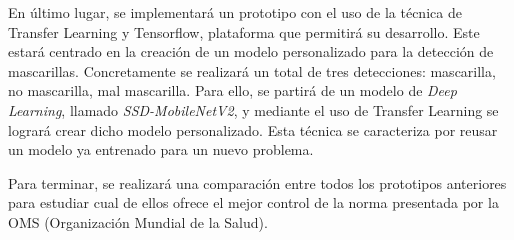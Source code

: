 En último lugar, se implementará un prototipo con el uso de la técnica de Transfer Learning y Tensorflow, plataforma que permitirá su desarrollo. Este estará centrado en la creación de un modelo personalizado para la detección de mascarillas. Concretamente se realizará un total de tres detecciones: mascarilla, no mascarilla, mal mascarilla. Para ello, se partirá de un modelo de \textit{Deep Learning}, llamado \textit{SSD-MobileNetV2}, y mediante el uso de Transfer Learning se logrará crear dicho modelo personalizado. Esta técnica se caracteriza por reusar un modelo ya entrenado para un nuevo problema.

Para terminar, se realizará una comparación entre todos los prototipos anteriores para estudiar cual de ellos ofrece el mejor control de la norma presentada por la OMS (Organización Mundial de la Salud).
